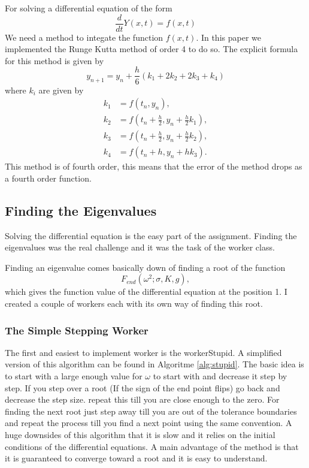For solving a differential equation of the form
\begin{equation}
\dfrac{d }{dt} Y(x,t) = f(x,t)
\end{equation}
We need a method to integate the function $ f(x,t) $.
In this paper we implemented the Runge Kutta method of order 4 to do so.
The explicit formula for this method is given by
\begin{equation}
y_{n+1} = y_n + \frac{h}{6}(k_{1} + 2k_{2} + 2k_{3} + k_{4})
\end{equation}
where $ k_i $ are given by
\begin{align*}
k_1 &= f(t_n, y_n),\\
k_2 &= f(t_n + \tfrac{h}{2}, y_n + \tfrac{h}{2} k_1),\\
k_3 &= f(t_n + \tfrac{h}{2}, y_n + \tfrac{h}{2} k_2),\\
k_4 &= f(t_n + h, y_n + hk_3).
\end{align*}
This method is of fourth order, this means that the error of the method drops as a fourth order function.
\subsection{Finding the Eigenvalues}
Solving the differential equation is the easy part of the assignment.
Finding the eigenvalues was the real challenge and it was the task of the worker class.

Finding an eigenvalue comes basically down of finding a root of the function
\begin{equation}
F_{end}(\omega^2;\sigma,K,g),
\end{equation}
which gives the function value of the differential equation at the position 1.
I created a couple of workers each with its own way of finding this root.

\subsubsection{The Simple Stepping Worker}

The first and easiest to implement worker is the workerStupid.
A simplified version of this algorithm can be found in Algoritme \ref{alg:stupid}.
The basic idea is to start with a large enough value for $ \omega $ to start with and decrease it step by step.
If you step over a root (If the sign of the end point flips) go back and decrease the step size.
repeat this till you are close enough to the zero.
For finding the next root just step away till you are out of the tolerance boundaries and repeat the process till you find a next point using the same convention.
A huge downsides of this algorithm that it is slow and it relies on the initial conditions of the differential equations.
A main advantage of the method is that it is guaranteed to converge toward a root and it is easy to understand.


